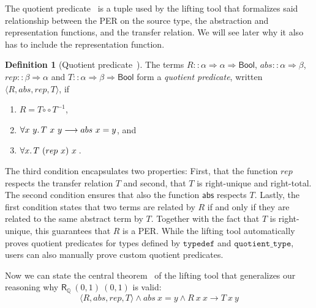 \documentclass{article}
\theoremstyle{definition}
\newtheorem{definition}{Definition}[section]
\newcommand{\relcomp}{\mathbin{\circ\circ}}
\newcommand{\inv}{^{-1}}
\newcommand{\bool}{\mathsf{Bool}}
\newcommand{\rat}{\mathbb{Q}}
\newcommand{\abs}{\mathsf{abs}}
\begin{document}
The quotient predicate~\cite{huffman2013lifting} is a tuple used by the lifting tool that formalizes said relationship between the PER on the source type,
the abstraction and representation functions,
and the transfer relation.
We will see later why it also has to include the representation function.
\begin{definition}[Quotient predicate~\cite{huffman2013lifting}]
  The terms \(R :: \alpha \Rightarrow \alpha \Rightarrow \bool\), \(abs :: \alpha \Rightarrow \beta\), \(rep :: \beta \Rightarrow \alpha\) and \(T :: \alpha \Rightarrow \beta \Rightarrow \bool\) form a \emph{quotient predicate},
  written \(\langle R, abs, rep, T \rangle\),
  if
	\begin{enumerate}
		\item \(R = T \relcomp T\inv\),
		\item \(\forall x\ y\ldotp T\ x\ y \longrightarrow abs\ x = y\), and
		\item \(\forall x\ldotp T\ (rep\ x)\ x\)\,.
	\end{enumerate}
\end{definition}
The third condition encapsulates two properties:
First, that the function \(rep\) respects the transfer relation \(T\) and second, that \(T\) is right-unique and right-total.
The second condition ensures that also the function \(\abs\) respects \(T\).
Lastly, the first condition states that two terms are related by \(R\) if and only if they are related to the same abstract term by \(T\).
Together with the fact that \(T\) is right-unique,
this guarantees that \(R\) is a PER.
While the lifting tool automatically proves quotient predicates for types defined by \(\mathtt{typedef}\) and \(\mathtt{quotient\_type}\),
users can also manually prove custom quotient predicates.

Now we can state the central theorem~\cite{huffman2013lifting} of the lifting tool that generalizes our reasoning why \(\mathsf{R_\rat}\ (0, 1)\ (0, 1)\) is valid:
\begin{equation}\label{eq:lifting-thm}
	\langle R, abs, rep, T \rangle \land abs\ x = y \land R\ x\ x \longrightarrow T\ x\ y
\end{equation}
\end{document}
